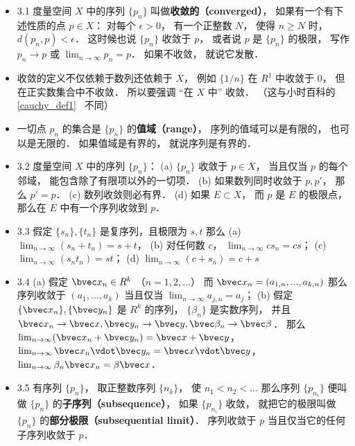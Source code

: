 \begin{itemize}
\item 3.1 度量空间 $X$ 中的序列 $\{p_n\}$ 叫做\textbf{收敛的（converged）}， 如果有一个有下述性质的点 $p\in X$： 对每个 $\epsilon > 0$， 有一个正整数 $N$， 使得 $n \geqslant N$ 时， $d(p_n,p) < \epsilon$． 这时候也说 $\{p_n\}$ 收敛于 $p$， 或者说 $p$ 是 $\{p_n\}$ 的极限， 写作 $p_n\to p$ 或 $\lim_{n\to \infty} p_n = p$． 如果不收敛， 就说它发散．

\item 收敛的定义不仅依赖于数列还依赖于 $X$， 例如 $\{1/n\}$ 在 $R^1$ 中收敛于 $0$， 但在正实数集合中不收敛． 所以要强调 “在 $X$ 中” 收敛． （这与小时百科的\autoref{cauchy_def1}~ 不同）

\item 一切点 $p_n$ 的集合是 $\{p_n\}$ 的\textbf{值域（range）}， 序列的值域可以是有限的， 也可以是无限的． 如果值域是有界的， 就说序列是有界的．

\item 3.2 度量空间 $X$ 中的序列 $\{p_n\}$： (a) $\{p_n\}$ 收敛于 $p\in X$， 当且仅当 $p$ 的每个邻域， 能包含除了有限项以外的一切项． (b) 如果数列同时收敛于 $p, p'$， 那么 $p' = p$． (c) 数列收敛则必有界． (d) 如果 $E \subset X$， 而 $p$ 是 $E$ 的极限点， 那么在 $E$ 中有一个序列收敛到 $p$．

\item 3.3 假定 $\{s_n\}, \{t_n\}$ 是复序列，且极限为 $s, t$ 那么 (a) $\lim_{n\to\infty} (s_n+t_n) = s+t$， (b) 对任何数 $c$， $\lim_{n\to\infty}cs_n = cs$； (c) $\lim_{n\to\infty}(s_n t_n) = st$； (d) $\lim_{n\to\infty} (c+s_n) = c+s$

\item 3.4 (a) 假定 $\bvec x_n \in R^k$ （$n=1,2,...$） 而 $\bvec x_n = (a_{1,n}, ...,a_{k,n})$ 那么序列收敛于 $(a_1,...,a_k)$ 当且仅当 $\lim_{n\to\infty} a_{j,n} = a_j$； (b) 假定 $\{\bvec x_n\}, \{\bvec y_n\}$ 是 $R^k$ 的序列， $\{\beta_n\}$ 是实数序列， 并且 $\bvec x_n\to \bvec x, \bvec y_n\to \bvec y, \bvec \beta_n\to\bvec \beta$． 那么 $\lim_{n\to\infty} (\bvec x_n+\bvec y_n) = \bvec x+\bvec y$， $\lim_{n\to\infty} \bvec x_n \vdot \bvec y_n = \bvec x \vdot \bvec y$， $\lim_{n\to\infty} \beta_n \bvec x_n = \beta \bvec x$．

\item 3.5 有序列 $\{p_n\}$， 取正整数序列 $\{n_k\}$， 使 $n_1<n_2<...$ 那么序列 $\{p_{n_i}\}$ 便叫做 $\{p_n\}$ 的\textbf{子序列（subsequence）}， 如果 $\{p_{n_i}\}$ 收敛， 就把它的极限叫做 $\{p_n\}$ 的\textbf{部分极限（subsequential limit）}． 序列收敛于 $p$ 当且仅当它的任何子序列收敛于 $p$．


\end{itemize}
